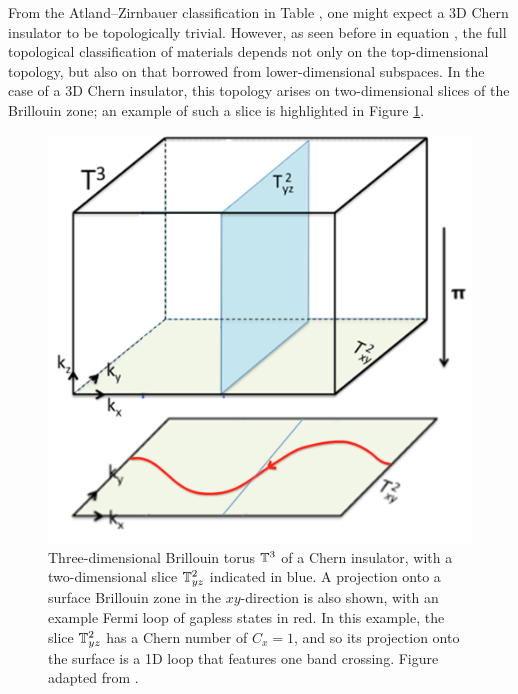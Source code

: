 From the Atland--Zirnbauer classification in Table \red{[reference]},%
one might expect a 3D Chern insulator to be topologically trivial. However, as seen before in equation ,%
the full topological classification of materials depends not only on the top-dimensional topology, but also on that borrowed from lower-dimensional subspaces. In the case of a 3D Chern insulator, this topology arises on two-dimensional slices of the Brillouin zone; an example of such a slice is highlighted in Figure \ref{fig:3D_Chern_insulator}.
\begin{figure}[htb!]
	\centering
	\includegraphics[width=.5\linewidth]{Images/3D_Chern_insulator}
	\caption{
		Three-dimensional Brillouin torus $\mathbb{T}^3$ of a Chern insulator, with a two-dimensional slice $\mathbb{T}_{yz}^2$ indicated in blue. A projection onto a surface Brillouin zone in the $xy$-direction is also shown, with an example Fermi loop of gapless states in red. In this example, the slice $\mathbb{T}_{yz}^2$ has a Chern number of $C_{x} = 1$, and so its projection onto the surface is a 1D loop that features one band crossing.
		Figure adapted from \cite{Mathai_math-review}.}
	\label{fig:3D_Chern_insulator}
\end{figure}

